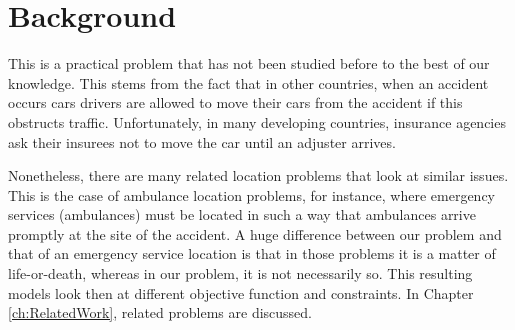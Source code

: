 \section{Background}
This is a practical problem
that has not been studied before
to the best of our knowledge.
This stems
from the fact
that in other countries,
when an accident occurs
cars drivers
are allowed to move their cars
from the accident
if this obstructs traffic.
Unfortunately,
in many developing countries,
insurance agencies
ask their insurees
not to move the car
until an adjuster arrives.

Nonetheless,
there are many related location problems
that look at similar issues.
This is the case of
ambulance location problems,
for instance,
where emergency services (ambulances)
must be located
in such a way that
ambulances arrive promptly
at the site of the accident.
A huge difference
between our problem
and that
of an emergency service location
is that in those problems
it is a matter of life-or-death,
whereas in our problem,
it is not necessarily so.
This resulting models
look then at different objective function
and constraints.
In Chapter \ref{ch:RelatedWork},
related problems are discussed.
